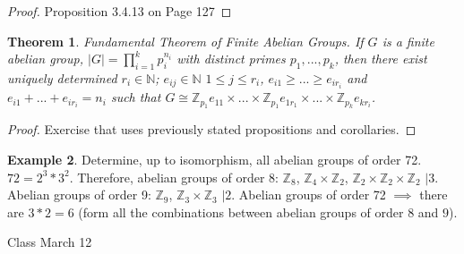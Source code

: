 \documentclass[11pt]{article}
\newtheorem{thm}{Theorem}[section]
\theoremstyle{definition}
\newtheorem{example}[thm]{Example}
\numberwithin{equation}{section}
\newcommand{\Z}{\mathbb{Z}}
\newcommand{\N}{\mathbb{N}} %
\begin{document}
\begin{proof}
Proposition 3.4.13 on Page 127
\end{proof}
\begin{thm}
Fundamental Theorem of Finite Abelian Groups. If $G$ is a finite abelian group, $|G| = \prod\limits_{i=1}^k p_{i}^{n_{i}}$ with distinct primes $p_1,...,p_k$, then there exist uniquely determined $r_i \in \N$; $e_{ij} \in \N$ $1 \leq j \leq r_{i}$, $e_{i1} \geq...\geq e_{ir_{i}}$ and $e_{i1}+...+e_{ir_{i}} = n_{i}$ such that $G \cong \Z_{p_{1}}e_{11} \times...\times \Z_{p_{1}}e_{1r_{1}} \times...\times \Z_{p_{k}}e_{kr_{i}}$.
\end{thm}
\begin{proof}
Exercise that uses previously stated propositions and corollaries.
\end{proof}
\begin{example}
Determine, up to isomorphism, all abelian groups of order 72. $72 = 2^{3} * 3^{2}$. Therefore, abelian groups of order $8$: $\Z_8$, $\Z_4 \times \Z_2$, $\Z_2 \times \Z_2 \times \Z_2$ $\mid 3$. Abelian groups of order 9: $\Z_9$, $\Z_3 \times \Z_3$ $\mid 2$. Abelian groups of order 72 $\implies$ there are $3*2 = 6$ (form all the combinations between abelian groups of order $8$ and $9$).
\end{example}

\begin{center}
{\sf\LARGE Class March 12}
\end{center}
\end{document}
